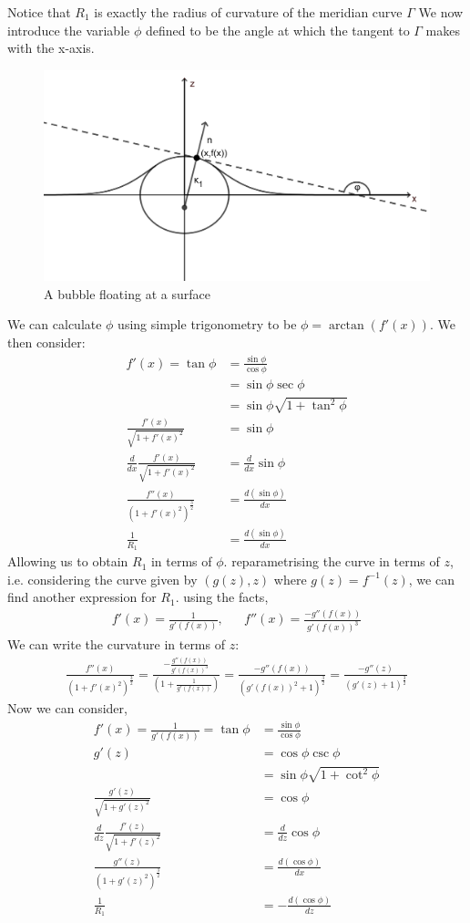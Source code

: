 Notice that $R_1$ is exactly the radius of curvature of the meridian curve $\Gamma$
We now introduce the variable $\phi$ defined to be the angle at which the tangent to $\Gamma$ makes with the x-axis. 
\begin{figure}[hb]
    \centering
    \includegraphics[width=0.55\linewidth]{WriteUp/images/tangent to bubble extra.png}
    \caption{A bubble floating at a surface}
    \label{fig:1}
\end{figure}
We can calculate $\phi$ using simple trigonometry to be $\phi=\arctan(f'(x))$. We then consider:
\begin{align}
    f'(x)=\tan \phi &= \frac{\sin\phi}{\cos\phi} \\
    &=\sin\phi\sec\phi \\
    &=\sin\phi \sqrt{1+\tan^2\phi}\\
    \frac{f'(x)}{\sqrt{1+f'(x)^2}}&=\sin\phi\\
    \frac{d}{dx} \frac{f'(x)}{\sqrt{1+f'(x)^2}}&=\frac{d}{dx}\sin\phi \\
    \frac{f''(x)}{(1+f'(x)^2)^{\frac{3}{2}}}&=\frac{d(\sin\phi)}{dx} \\
    \frac{1}{R_1}&=\frac{d(\sin\phi)}{dx}
\end{align}
Allowing us to obtain $R_1$ in terms of $\phi$. reparametrising the curve in terms of $z$, i.e. considering the curve given by $(g(z),z)$ where $g(z)=f^{-1}(z)$, we can find another expression for $R_1$. using the facts,
\begin{align}
    f'(x)=\frac{1}{g'(f(x))}, && f''(x) = \frac{-g''(f(x))}{g'(f(x))^3}
\end{align}
We can write the curvature in terms of $z$:
\begin{align}
    \frac{f''(x)}{(1+f'(x)^2)^{\frac{3}{2}}}=\frac{-\frac{g''(f(x))}{g'(f(x))^3}}{(1+\frac{1}{g'(f(x))})} = \frac{-g''(f(x))}{(g'(f(x))^2+1)^{\frac{3}{2}}} = \frac{-g''(z)}{(g'(z)+1)^{\frac{3}{2}}}
\end{align}
Now we can consider,
\begin{align}
    f'(x)=\frac{1}{g'(f(x))}=\tan \phi &= \frac{\sin\phi}{\cos\phi} \\
    g'(z)&=\cos\phi\csc\phi \\
    &=\sin\phi \sqrt{1+\cot^2\phi}\\
    \frac{g'(z)}{\sqrt{1+g'(z)^2}}&=\cos\phi\\
    \frac{d}{dz} \frac{f'(z)}{\sqrt{1+f'(z)^2}}&=\frac{d}{dz}\cos\phi \\
    \frac{g''(z)}{(1+g'(z)^2)^{\frac{3}{2}}}&=\frac{d(\cos\phi)}{dx} \\
    \frac{1}{R_1}&=-\frac{d(\cos\phi)}{dz}
\end{align}
